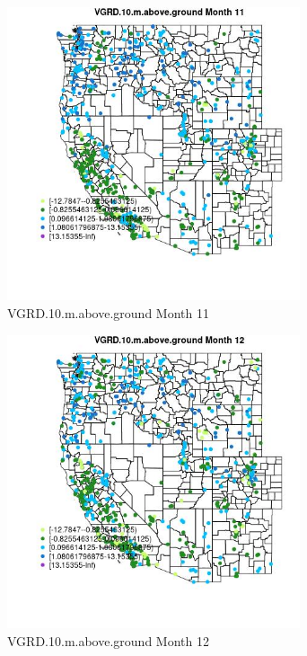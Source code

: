 \begin{figure} 
\centering  
\includegraphics[width=0.77\textwidth]{Code_Outputs/Report_ML_input_PM25_Step4_part_e_de_duplicated_aves_compiled_2019-05-21wNAs_MapObsMo11VGRD10maboveground.jpg} 
\caption{\label{fig:Report_ML_input_PM25_Step4_part_e_de_duplicated_aves_compiled_2019-05-21wNAsMapObsMo11VGRD10maboveground}VGRD.10.m.above.ground Month 11} 
\end{figure} 
 

\begin{figure} 
\centering  
\includegraphics[width=0.77\textwidth]{Code_Outputs/Report_ML_input_PM25_Step4_part_e_de_duplicated_aves_compiled_2019-05-21wNAs_MapObsMo12VGRD10maboveground.jpg} 
\caption{\label{fig:Report_ML_input_PM25_Step4_part_e_de_duplicated_aves_compiled_2019-05-21wNAsMapObsMo12VGRD10maboveground}VGRD.10.m.above.ground Month 12} 
\end{figure} 
 

